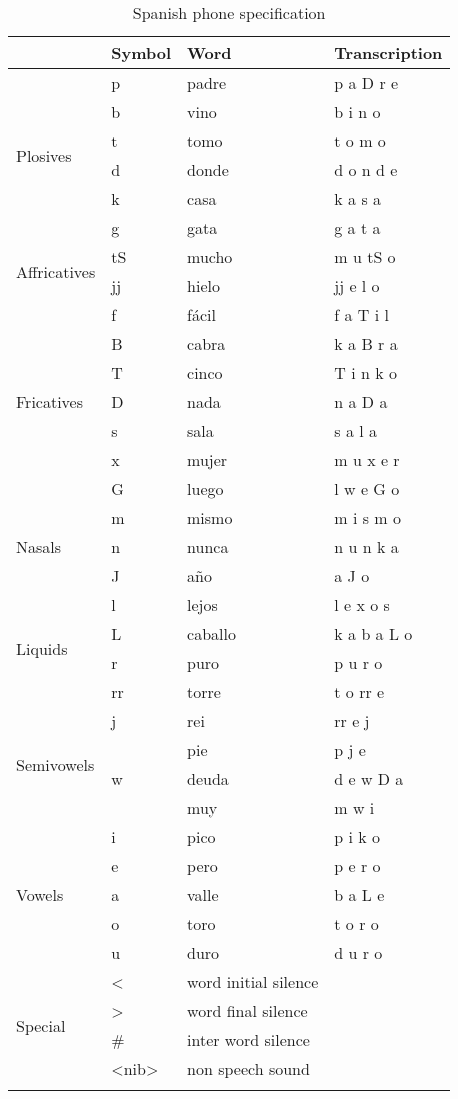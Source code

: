 {\small
\begin{longtable}{l|l|l|l}
	\toprule
	& Symbol & Word & Transcription\\
	\midrule
	\multirow{6}{*}{Plosives} &
	p & padre & p a D r e\\
  & b & vino & b i n o\\
  & t & tomo & t o m o\\
  & d & donde & d o n d e\\
  & k & casa & k a s a\\
  & g & gata & g a t a\\
	\midrule
	\multirow{2}{*}{Affricatives} &
	tS & mucho & m u tS o\\
	& jj & hielo & jj e l o\\
	\midrule
	\multirow{7}{*}{Fricatives} &
	f & fácil & f a T i l\\
	& B & cabra & k a B r a\\
	& T & cinco & T i n k o\\
	& D & nada & n a D a\\
	& s & sala & s a l a \\
	& x & mujer & m u x e r\\
	& G & luego & l w e G o\\
	\midrule
	\multirow{3}{*}{Nasals} &
	m & mismo & m i s m o\\
	& n & nunca & n u n k a\\
	& J & año & a J o\\
	\midrule
	\multirow{4}{*}{Liquids} & 
	l & lejos & l e x o s\\
	& L & caballo & k a b a L o\\
	& r & puro & p u r o\\
	& rr & torre & t o rr e\\
	\midrule
	\multirow{4}{*}{Semivowels} &
	j & rei & rr e j\\
	&  & pie & p j e\\
	& w & deuda & d e w D a\\
	&  & muy & m w i\\
	\midrule
	\multirow{5}{*}{Vowels} &
	i & pico & p i k o\\
	& e & pero & p e r o\\
	& a & valle & b a L e\\
	& o & toro & t o r o\\
	& u & duro & d u r o\\
	\midrule
	\multirow{4}{*}{Special} &
	\textless{} & word initial silence & \\
	& \textgreater{} & word final silence & \\
	& \# & inter word silence & \\
	& \textless{}nib\textgreater{} & non speech sound & \\
	\bottomrule
	\caption{Spanish phone specification}
\end{longtable}
}

